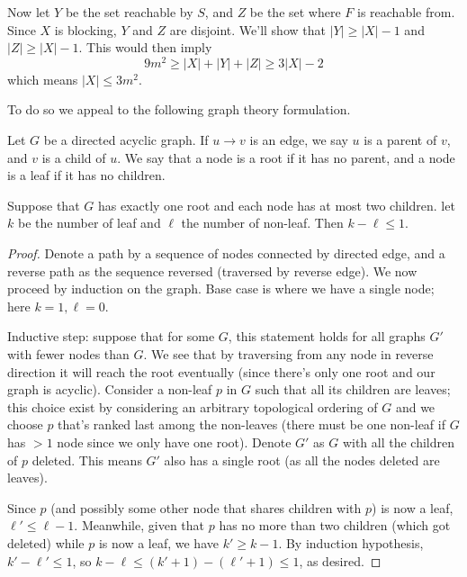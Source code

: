 \documentclass[11pt,a4paper]{article}
\begin{document}
\begin{enumerate}
        Now let $Y$ be the set reachable by $S$, and $Z$ be the set where $F$ is reachable from. 
        Since $X$ is blocking, $Y$ and $Z$ are disjoint. 
        We'll show that $|Y|\ge |X|-1$ and $|Z|\ge |X|-1$. 
        This would then imply 
        \begin{equation}
        	9m^2 \ge |X| + |Y| + |Z| \ge 3|X| - 2
        \end{equation}
        which means $|X|\le 3m^2$. 
        
        To do so we appeal to the following graph theory formulation. 
        \begin{lemma}
        	Let $G$ be a directed acyclic graph. If $u\to v$ is an edge, 
        	we say $u$ is a parent of $v$, and $v$ is a child of $u$. 
        	We say that a node is a root if it has no parent, 
        	and a node is a leaf if it has no children. 
        	
        	Suppose that $G$ has exactly one root and each node has at most two children. 
        	let $k$ be the number of leaf and $\ell$ the number of non-leaf. 
        	Then $k-\ell \le 1$. 
        \end{lemma}
        
        \begin{proof}
        	Denote a path by a sequence of nodes connected by directed edge, 
        	and a reverse path as the sequence reversed (traversed by reverse edge). 
        	We now proceed by induction on the graph. 
        	Base case is where we have a single node; here $k=1, \ell=0$. 
        	
        	Inductive step: suppose that for some $G$, 
        	this statement holds for all graphs $G'$ with fewer nodes than $G$. 
        	We see that by traversing from any node in reverse direction it will reach the root eventually 
        	(since there's only one root and our graph is acyclic). 
        	Consider a non-leaf $p$ in $G$ such that all its children are leaves; 
        	this choice exist by considering an arbitrary topological ordering of $G$ and we choose $p$ that's ranked last among the non-leaves 
        	(there must be one non-leaf if $G$ has $>1$ node since we only have one root). 
        	Denote $G'$ as $G$ with all the children of $p$ deleted. 
        	This means $G'$ also has a single root (as all the nodes deleted are leaves). 
        	
        	Since $p$ (and possibly some other node that shares children with $p$) is now a leaf, 
        	$\ell'\le \ell-1$. 
        	Meanwhile, given that $p$ has no more than two children (which got deleted) while $p$ is now a leaf, 
        	we have $k'\ge k-1$. 
        	By induction hypothesis, 
        	$k'-\ell'\le 1$, 
        	so $k-\ell \le (k' + 1) - (\ell'+1) \le 1$, as desired. 
        \end{proof}
        

\end{enumerate}
\end{document}
